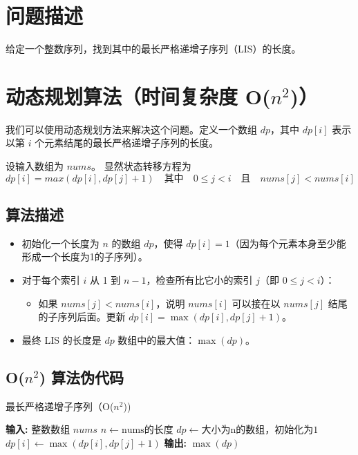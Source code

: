 \documentclass[UTF8]{ctexart}
\begin{document}
\pagestyle{fancy}
\fancyhead{}
\rhead{\today}

\section{问题描述}
给定一个整数序列，找到其中的最长严格递增子序列（LIS）的长度。

\section{动态规划算法（时间复杂度 O($n^2$)）}
我们可以使用动态规划方法来解决这个问题。定义一个数组 \( dp \)，其中 \( dp[i] \) 表示以第 \( i \) 个元素结尾的最长严格递增子序列的长度。
\par 设输入数组为 \( nums \)。
显然状态转移方程为$$    
    dp[i] = max(dp[i], dp[j] + 1) \quad \text{其中} \quad 0 \leq j < i \quad \text{且} \quad nums[j] < nums[i]$$
\subsection{算法描述}
\begin{itemize}
    \item 初始化一个长度为 \( n \) 的数组 \( dp \)，使得 \( dp[i] = 1 \)（因为每个元素本身至少能形成一个长度为1的子序列）。
    \item 对于每个索引 \( i \) 从 1 到 \( n-1 \)，检查所有比它小的索引 \( j \)（即 \( 0 \leq j < i \)）：
    \begin{itemize}
        \item 如果 \( nums[j] < nums[i] \)，说明 \( nums[i] \) 可以接在以 \( nums[j] \) 结尾的子序列后面。更新 \( dp[i] = \max(dp[i], dp[j] + 1) \)。
    \end{itemize}
    \item 最终 LIS 的长度是 \( dp \) 数组中的最大值：\( \max(dp) \)。
\end{itemize}

\subsection{O($n^2$) 算法伪代码}
\begin{algorithm}
\caption{最长严格递增子序列（O($n^2$))}
\begin{algorithmic}[1]
\STATE \textbf{输入:} 整数数组 \( nums \)
\STATE \( n \gets \text{nums的长度} \)
\STATE \( dp \gets \text{大小为n的数组，初始化为1} \)
            \STATE \( dp[i] \gets \max(dp[i], dp[j] + 1) \)
        \ENDIF
    \ENDFOR
\ENDFOR
\STATE \textbf{输出:} \( \max(dp) \)
\end{algorithmic}
\end{algorithm}
\end{document}
